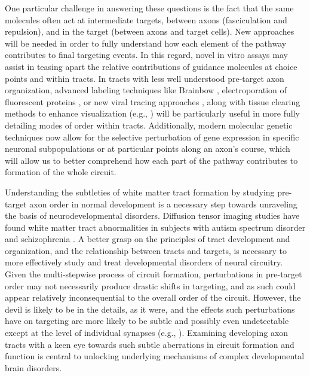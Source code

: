 One particular challenge in answering these questions is the fact that the same molecules often act at intermediate targets, between axons (fasciculation and repulsion), and in the target (between axons and target cells).
New approaches will be needed in order to fully understand how each element of the pathway contributes to final targeting events.
In this regard, novel in vitro assays may assist in teasing apart the relative contributions of guidance molecules at choice points and within tracts.
In tracts with less well understood pre-target axon organization, advanced labeling techniques like Brainbow \cite{lu2009interscutularis}, electroporation of fluorescent proteins \cite{saito2001efficient}, or new viral tracing approaches \cite{reardon2016rabies}, along with tissue clearing methods to enhance visualization (e.g., ) will be particularly useful in more fully detailing modes of order within tracts.
Additionally, modern molecular genetic techniques now allow for the selective perturbation of gene expression in specific neuronal subpopulations or at particular points along an axon’s course, which will allow us to better comprehend how each part of the pathway contributes to formation of the whole circuit.

Understanding the subtleties of white matter tract formation by studying pre-target axon order in normal development is a necessary step towards unraveling the basis of neurodevelopmental disorders.
Diffusion tensor imaging studies have found white matter tract abnormalities in subjects with autism spectrum disorder \cite{wolff2012differences} and schizophrenia \cite{kubicki2007review}.
A better grasp on the principles of tract development and organization, and the relationship between tracts and targets, is necessary to more effectively study and treat developmental disorders of neural circuitry.
Given the multi-stepwise process of circuit formation, perturbations in pre-target order may not necessarily produce drastic shifts in targeting, and as such could appear relatively inconsequential to the overall order of the circuit.
However, the devil is likely to be in the details, as it were, and the effects such perturbations have on targeting are more likely to be subtle and possibly even undetectable except at the level of individual synapses (e.g., ).
Examining developing axon tracts with a keen eye towards such subtle aberrations in circuit formation and function is central to unlocking underlying mechanisms of complex developmental brain disorders.

